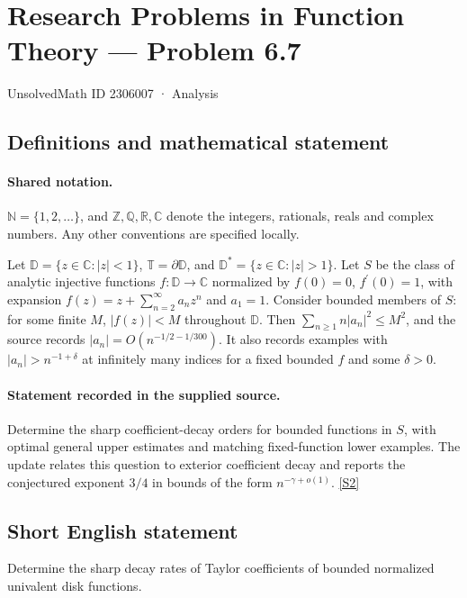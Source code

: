 \documentclass[11pt]{book}
\newcommand{\sref}[2]{\hyperlink{source:#1:#2}{[S#2]}}
\begin{document}
\setcounter{section}{2306006}
\section{Research Problems in Function Theory — Problem 6.7}\label{2306007}
{\small\sffamily UnsolvedMath ID 2306007 · Analysis}
\subsection{Definitions and mathematical statement}

\paragraph{Shared notation.}$\mathbb N=\{1,2,\ldots\}$, and $\mathbb Z,\mathbb Q,\mathbb R,\mathbb C$ denote the integers, rationals, reals and complex numbers. Any other conventions are specified locally.


Let $\mathbb D=\{z\in\mathbb C:|z|<1\}$, $\mathbb T=\partial\mathbb D$, and $\mathbb D^*=\{z\in\mathbb C:|z|>1\}$. Let $S$ be the class of analytic injective functions $f:\mathbb D\to\mathbb C$ normalized by $f(0)=0$, $f^{\prime}(0)=1$, with expansion $f(z)=z+\sum_{n=2}^{\infty}a_nz^n$ and $a_1=1$. Consider bounded members of $S$: for some finite $M$, $|f(z)|<M$ throughout $\mathbb D$. Then $\sum_{n\ge1}n|a_n|^2\le M^2$, and the source records $|a_n|=O(n^{-1/2-1/300})$. It also records examples with $|a_n|>n^{-1+\delta}$ at infinitely many indices for a fixed bounded $f$ and some $\delta>0$.
\paragraph{Statement recorded in the supplied source.}
Determine the sharp coefficient-decay orders for bounded functions in $S$, with optimal general upper estimates and matching fixed-function lower examples. The update relates this question to exterior coefficient decay and reports the conjectured exponent $3/4$ in bounds of the form $n^{-\gamma+o(1)}$. \sref{2306007}{2}
\subsection{Short English statement}
Determine the sharp decay rates of Taylor coefficients of bounded normalized univalent disk functions.
\end{document}
